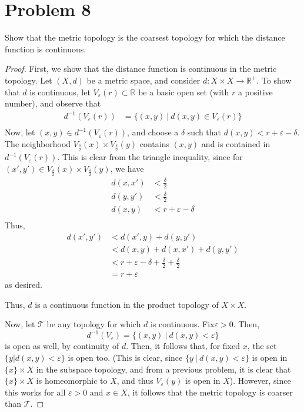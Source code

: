 \documentclass[fontsize=11pt]{scrartcl} %
\numberwithin{equation}{section} %
\numberwithin{figure}{section} %
\numberwithin{table}{section} %
\newcommand{\R}{\mathbb{R}}
\begin{document}
\section*{Problem 8}
Show that the metric topology is the coarsest topology for which the distance function
is continuous.
\\
\begin{proof}
First, we show that the distance function is continuous in the metric topology. Let $(X,d)$
be a metric space, and consider $d:X\times X\to \R^+$. To show that $d$ is  continuous, let
$V_{\varepsilon}(r)\subset \R$ be a basic open set (with $r$ a positive number), and observe that
\[
\begin{aligned}
d^{-1}(V_{\varepsilon}(r)) &= \{(x,y)\ |\ d(x,y)\in V_{\varepsilon}(r)\}\\
\end{aligned}
\]
Now, let $(x,y)\in d^{-1}(V_{\varepsilon}(r))$, and choose a $\delta$ such that $d(x,y) < r +\varepsilon - \delta$.
The neighborhood $V_{\frac{\delta}{2}}(x)\times V_{\frac{\delta}{2}}(y)$
contains $(x,y)$ and is contained in $d^{-1}(V_{\varepsilon}(r))$. This is clear from the triangle
inequality, since for $(x',y')\in V_{\frac{\delta}{2}}(x)\times V_{\frac{\delta}{2}}(y)$,
we have
\[
\begin{aligned}
d(x,x') &< \frac{\delta}{2}\\
d(y,y') &< \frac{\delta}{2}\\
d(x,y)  &< r+\varepsilon - \delta\\
\end{aligned}
\]
Thus,
\[
\begin{aligned}
d(x',y')    &< d(x',y) + d(y,y')\\
            &< d(x,y) + d(x,x') + d(y,y')\\
            &< r+\varepsilon - \delta + \frac{\delta}{2} + \frac{\delta}{2}\\
            &= r+\varepsilon
\end{aligned}
\]
as desired.

Thus, $d$ is a continuous function in the product topology of $X\times X$.

Now, let $\mathscr{T}$ be any topology for which $d$ is continuous. Fix$\varepsilon > 0$.
Then,
\[
d^{-1}(V_{\varepsilon}) =  \{(x,y)\ |\ d(x,y) < \varepsilon\}
\]
is open as well, by continuity of $d$. Then, it follows that, for fixed $x$, the set
$\{y | d(x,y) < \varepsilon\}$ is open too. 
(This is clear, since $\{y\ |\ d(x,y) < \varepsilon\}$ is open in $\{x\}\times X$ in the
subspace topology, and from a previous problem, it is clear that $\{x\}\times X$ is homeomorphic
to $X$, and thus $V_{\varepsilon}(y)$ is open in $X$).
However, since this works for all $\varepsilon > 0$
and $x\in X$, it follows that the metric topology is coarser than $\mathscr{T}$.
\end{proof}
\end{document}
